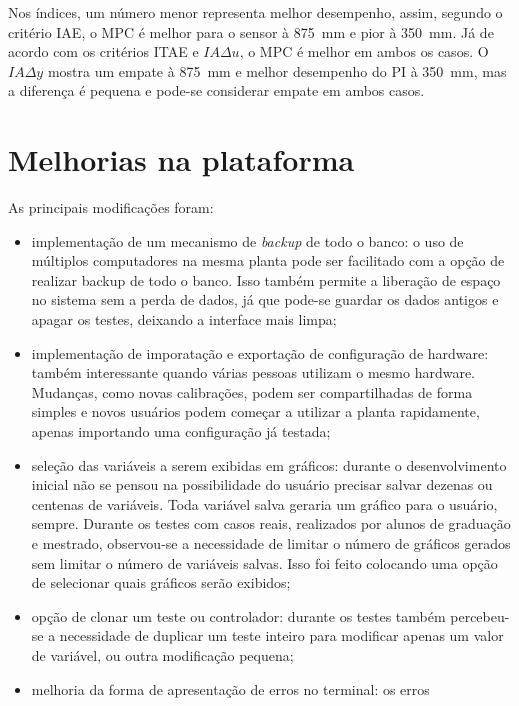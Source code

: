 Nos índices, um número menor representa melhor desempenho, assim, segundo o
critério IAE, o MPC é melhor para o sensor à \SI{875}{\milli\metre} e pior à
\SI{350}{\milli\metre}. Já de acordo com os critérios ITAE e \(IA\Delta{}u\), o
MPC é melhor em ambos os casos. O \(IA\Delta{}y\) mostra um empate à
\SI{875}{\milli\metre} e melhor desempenho do PI à \SI{350}{\milli\metre}, mas a
diferença é pequena e pode-se considerar empate em ambos casos.

\section{Melhorias na plataforma}%
\label{sec:platform-enhancements}

As principais modificações foram:

\begin{itemize}
	\item implementação de um mecanismo de \textit{backup} de todo o banco: o
	      uso de múltiplos computadores na mesma planta pode ser facilitado com
	      a opção de realizar backup de todo o banco. Isso também permite a
	      liberação de espaço no sistema sem a perda de dados, já que pode-se
	      guardar os dados antigos e apagar os testes, deixando a interface mais
	      limpa;
	\item implementação de imporatação e exportação de configuração de hardware:
	      também interessante quando várias pessoas utilizam o mesmo hardware.
	      Mudanças, como novas calibrações, podem ser compartilhadas de forma
	      simples e novos usuários podem começar a utilizar a planta
	      rapidamente, apenas importando uma configuração já testada;
	\item seleção das variáveis a serem exibidas em gráficos: durante o
	      desenvolvimento inicial não se pensou na possibilidade do usuário
	      precisar salvar dezenas ou centenas de variáveis. Toda variável salva
	      geraria um gráfico para o usuário, sempre. Durante os testes com casos
	      reais, realizados por alunos de graduação e mestrado, observou-se a
	      necessidade de limitar o número de gráficos gerados sem limitar o
	      número de variáveis salvas. Isso foi feito colocando uma opção de
	      selecionar quais gráficos serão exibidos;
	\item opção de clonar um teste ou controlador: durante os testes também
	      percebeu-se a necessidade de duplicar um teste inteiro para modificar
	      apenas um valor de variável, ou outra modificação pequena;
	\item melhoria da forma de apresentação de erros no terminal: os erros

\end{itemize}
